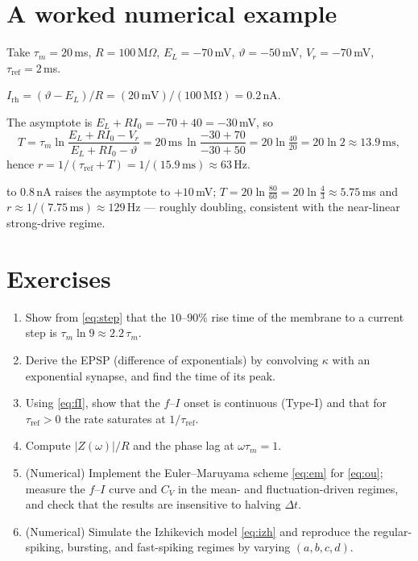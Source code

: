 \documentclass[11pt]{article}
\begin{document}
\section{A worked numerical example}
Take $\tau_m=20$\,ms, $R=100$\,M$\Omega$, $E_L=-70$\,mV, $\vartheta=-50$\,mV, $V_r=-70$\,mV,
$\tau_{\mathrm{ref}}=2$\,ms.
\begin{description}[leftmargin=1.4em,style=nextline]
  \item[(a) Rheobase.] $I_{\mathrm{rh}}=(\vartheta-E_L)/R=(20\,\mathrm{mV})/(100\,\mathrm{M\Omega})
  =0.2$\,nA.
  \item[(b) Rate at $I_0=0.4$\,nA.] The asymptote is $E_L+RI_0=-70+40=-30$\,mV, so
  \[
   T=\tau_m\ln\frac{E_L+RI_0-V_r}{E_L+RI_0-\vartheta}
    =20\,\mathrm{ms}\,\ln\frac{-30+70}{-30+50}=20\ln\tfrac{40}{20}=20\ln2\approx13.9\,\mathrm{ms},
  \]
  hence $r=1/(\tau_{\mathrm{ref}}+T)=1/(15.9\,\mathrm{ms})\approx63$\,Hz.
  \item[(c) Doubling the current] to $0.8$\,nA raises the asymptote to $+10$\,mV;
  $T=20\ln\frac{80}{60}=20\ln\tfrac43\approx5.75$\,ms and $r\approx1/(7.75\,\mathrm{ms})\approx
  129$\,Hz --- roughly doubling, consistent with the near-linear strong-drive regime.
\end{description}

\section*{Exercises}
\begin{enumerate}[leftmargin=1.6em]
  \item Show from \eqref{eq:step} that the $10$--$90\%$ rise time of the membrane to a current step
  is $\tau_m\ln9\approx2.2\,\tau_m$.
  \item Derive the EPSP (difference of exponentials) by convolving $\kappa$ with an exponential
  synapse, and find the time of its peak.
  \item Using \eqref{eq:fI}, show that the $f$--$I$ onset is continuous (Type-I) and that for
  $\tau_{\mathrm{ref}}>0$ the rate saturates at $1/\tau_{\mathrm{ref}}$.
  \item Compute $|Z(\omega)|/R$ and the phase lag at $\omega\tau_m=1$.
  \item (Numerical) Implement the Euler--Maruyama scheme \eqref{eq:em} for \eqref{eq:ou}; measure the
  $f$--$I$ curve and $C_V$ in the mean- and fluctuation-driven regimes, and check that the results are
  insensitive to halving $\Delta t$.
  \item (Numerical) Simulate the Izhikevich model \eqref{eq:izh} and reproduce the regular-spiking,
  bursting, and fast-spiking regimes by varying $(a,b,c,d)$.
\end{enumerate}
\end{document}
